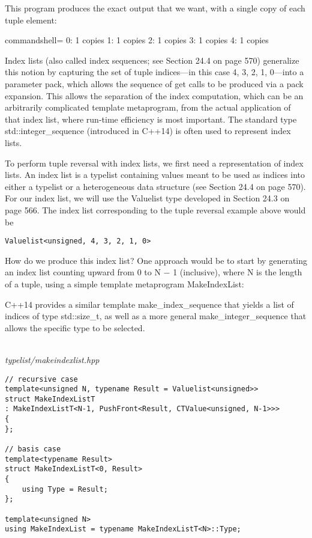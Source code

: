 This program produces the exact output that we want, with a single copy of each tuple element:

\begin{tcblisting}{commandshell={}}
0: 1 copies
1: 1 copies
2: 1 copies
3: 1 copies
4: 1 copies
\end{tcblisting}

Index lists (also called index sequences; see Section 24.4 on page 570) generalize this notion by capturing the set of tuple indices—in this case 4, 3, 2, 1, 0—into a parameter pack, which allows the sequence of get calls to be produced via a pack expansion. This allows the separation of the index computation, which can be an arbitrarily complicated template metaprogram, from the actual application of that index list, where run-time efficiency is most important. The standard type std::integer\_sequence (introduced in C++14) is often used to represent index lists.


To perform tuple reversal with index lists, we first need a representation of index lists. An index list is a typelist containing values meant to be used as indices into either a typelist or a heterogeneous data structure (see Section 24.4 on page 570). For our index list, we will use the Valuelist type developed in Section 24.3 on page 566. The index list corresponding to the tuple reversal example above would be

\begin{lstlisting}[style=styleCXX]
Valuelist<unsigned, 4, 3, 2, 1, 0>
\end{lstlisting}

How do we produce this index list? One approach would be to start by generating an index list counting upward from 0 to N − 1 (inclusive), where N is the length of a tuple, using a simple template metaprogram MakeIndexList:

\begin{tcolorbox}[colback=webgreen!5!white,colframe=webgreen!75!black]
\hspace*{0.75cm}C++14 provides a similar template make\_index\_sequence that yields a list of indices of type std::size\_t, as well as a more general make\_integer\_sequence that allows the specific type to be selected.
\end{tcolorbox}

\hspace*{\fill} \\ %
\noindent
\textit{typelist/makeindexlist.hpp}
\begin{lstlisting}[style=styleCXX]
// recursive case
template<unsigned N, typename Result = Valuelist<unsigned>>
struct MakeIndexListT
: MakeIndexListT<N-1, PushFront<Result, CTValue<unsigned, N-1>>>
{
};

// basis case
template<typename Result>
struct MakeIndexListT<0, Result>
{
	using Type = Result;
};

template<unsigned N>
using MakeIndexList = typename MakeIndexListT<N>::Type;
\end{lstlisting}

